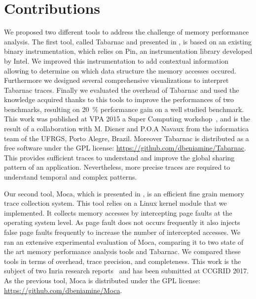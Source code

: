 \section{Contributions}

We proposed two different tools to address the challenge of memory performance analysis.
The first tool, called \gls{Tabarnac} and presented in , is based on an existing binary instrumentation, which relies on \gls{Pin}, an instrumentation library developed by \gls{Intel}.
We improved this instrumentation to add contextual information allowing to determine on which data structure the memory accesses occured.
Furthermore we designed several comprehensive visualizations to interpret \gls{Tabarnac} traces.
Finally we evaluated the overhead of \gls{Tabarnac} and used the knowledge acquired thanks to this tools to improve the performances of two benchmarks, resulting on \SI{20}{\%} performance gain on a well studied benchmark.
This work was published at \gls{VPA} 2015 a Super Computing workshop~\cite{Beniamine15TABARNAC}, and is the result of a collaboration with M. Diener and P.O.A Navaux from the informatica team of the \gls{UFRGS}, Porto Alegre, Brazil.
Moreover \gls{Tabarnac} is distributed as a free software under the \gls{GPL} license: \url{https://github.com/dbeniamine/Tabarnac}.
This provides sufficient traces to understand and improve the global sharing pattern of an application.
Nevertheless, more precise traces are required to understand temporal and complex patterns.

Our second tool, \gls{Moca}, which is presented in , is an efficient fine grain memory trace collection system.
This tool relies on a \gls{Linux} kernel module that we implemented.
It collects memory accesses by intercepting page faults at the operating system level.
As page fault does not occurs frequently it also injects false page faults frequently to increase the number of intercepted accesses.
We ran an extensive experimental evaluation of \gls{Moca}, comparing it to two state of the art memory performance analysis tools and \gls{Tabarnac}.
We compared these tools in terms of overhead, trace precision, and completeness.
This work is the subject of two Inria research reports~\cite{Beniamine15Memory,Beniamine16Moca} and has been submitted at \gls{CCGRID} 2017.
As the previous tool, \gls{Moca} is distributed under the \gls{GPL} license: \url{https://github.com/dbeniamine/Moca}.

